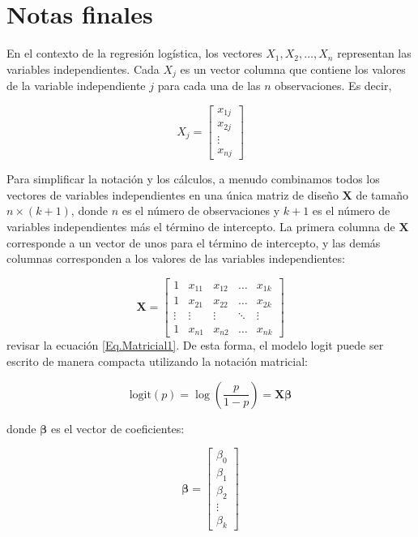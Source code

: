 \documentclass[a4paper]{report} %
\begin{document}
\section*{Notas finales}

En el contexto de la regresión logística, los vectores $X_1, X_2, \ldots, X_n$ representan las variables independientes. Cada $X_j$ es un vector columna que contiene los valores de la variable independiente $j$ para cada una de las $n$ observaciones. Es decir,

\begin{equation}
X_j = \begin{bmatrix}
x_{1j} \\
x_{2j} \\
\vdots \\
x_{nj}
\end{bmatrix}
\end{equation}

Para simplificar la notación y los cálculos, a menudo combinamos todos los vectores de variables independientes en una única matriz de diseño $\mathbf{X}$ de tamaño $n \times (k+1)$, donde $n$ es el número de observaciones y $k+1$ es el número de variables independientes más el término de intercepto. La primera columna de $\mathbf{X}$ corresponde a un vector de unos para el término de intercepto, y las demás columnas corresponden a los valores de las variables independientes:

\begin{equation}
\mathbf{X} = \begin{bmatrix}
1 & x_{11} & x_{12} & \ldots & x_{1k} \\
1 & x_{21} & x_{22} & \ldots & x_{2k} \\
\vdots & \vdots & \vdots & \ddots & \vdots \\
1 & x_{n1} & x_{n2} & \ldots & x_{nk}
\end{bmatrix}
\end{equation}
revisar la ecuaci\'on \ref{Eq.Matricial1}. De esta forma, el modelo logit puede ser escrito de manera compacta utilizando la notación matricial:

\begin{equation}
\text{logit}(p) = \log\left(\frac{p}{1-p}\right) = \mathbf{X} \boldsymbol{\beta}
\end{equation}

donde $\boldsymbol{\beta}$ es el vector de coeficientes:

\begin{equation}
\boldsymbol{\beta} = \begin{bmatrix}
\beta_0 \\
\beta_1 \\
\beta_2 \\
\vdots \\
\beta_k
\end{bmatrix}
\end{equation}
\end{document}
